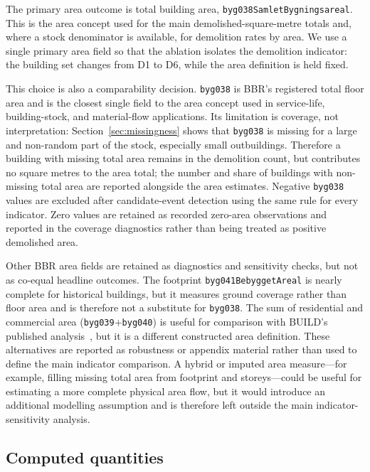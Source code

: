 The primary area outcome is total building area,
\texttt{byg038SamletBygningsareal}. This is the area concept used for the
main demolished-square-metre totals and, where a stock denominator is
available, for demolition rates by area. We use a single primary area
field so that the ablation isolates the demolition indicator: the
building set changes from D1 to D6, while the area definition is held
fixed.

This choice is also a comparability decision. \texttt{byg038} is BBR's
registered total floor area and is the closest single field to the area
concept used in service-life, building-stock, and material-flow
applications. Its limitation is coverage, not interpretation:
Section~\ref{sec:missingness} shows that \texttt{byg038} is missing for a
large and non-random part of the stock, especially small outbuildings.
Therefore a building with missing total area remains in the demolition
count, but contributes no square metres to the area total; the number and
share of buildings with non-missing total area are reported alongside the
area estimates. Negative \texttt{byg038} values are excluded after
candidate-event detection using the same rule for every indicator. Zero
values are retained as recorded zero-area observations and reported in
the coverage diagnostics rather than being treated as positive demolished
area.

Other BBR area fields are retained as diagnostics and sensitivity checks,
but not as co-equal headline outcomes. The footprint
\texttt{byg041BebyggetAreal} is nearly complete for historical buildings,
but it measures ground coverage rather than floor area and is therefore
not a substitute for \texttt{byg038}. The sum of residential and
commercial area (\texttt{byg039}+\texttt{byg040}) is useful for comparison
with BUILD's published analysis~\cite{jensen2025nedrivning}, but it is a
different constructed area definition. These alternatives are reported as
robustness or appendix material rather than used to define the main
indicator comparison. A hybrid or imputed area measure---for example,
filling missing total area from footprint and storeys---could be useful
for estimating a more complete physical area flow, but it would introduce
an additional modelling assumption and is therefore left outside the main
indicator-sensitivity analysis.

\subsection{Computed quantities}\label{sec:metrics}

